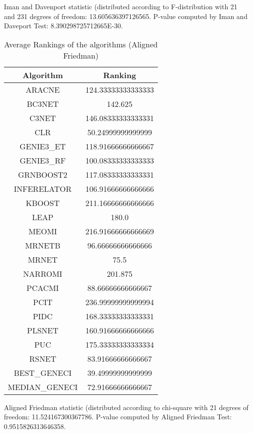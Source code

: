 \documentclass[a4paper,10pt]{article}
\begin{document}
\begin{landscape}
Iman and Davenport statistic (distributed according to F-distribution with 21 and 231 degrees of freedom: 13.605636397126565. 
P-value computed by Iman and Daveport Test: 8.390298725712665E-30.\newline


\newpage

\begin{table}[!htp]
\centering
\caption{Average Rankings of the algorithms (Aligned Friedman)
}\begin{tabular}{c|c}
Algorithm&Ranking\\
\hline
ARACNE&124.33333333333333\\
BC3NET&142.625\\
C3NET&146.08333333333331\\
CLR&50.24999999999999\\
GENIE3_ET&118.91666666666667\\
GENIE3_RF&100.08333333333333\\
GRNBOOST2&117.08333333333331\\
INFERELATOR&106.91666666666666\\
KBOOST&211.16666666666666\\
LEAP&180.0\\
MEOMI&216.91666666666669\\
MRNETB&96.66666666666666\\
MRNET&75.5\\
NARROMI&201.875\\
PCACMI&88.66666666666667\\
PCIT&236.99999999999994\\
PIDC&168.33333333333331\\
PLSNET&160.91666666666666\\
PUC&175.33333333333334\\
RSNET&83.91666666666667\\
BEST_GENECI&39.49999999999999\\
MEDIAN_GENECI&72.91666666666667\\
\end{tabular}
\end{table}


Aligned Friedman statistic (distributed according to chi-square with 21 degrees of freedom: 11.524167300367786. 
P-value computed by Aligned Friedman Test: 0.9515826313646358.\newline


\newpage


\end{landscape}
\end{document}
